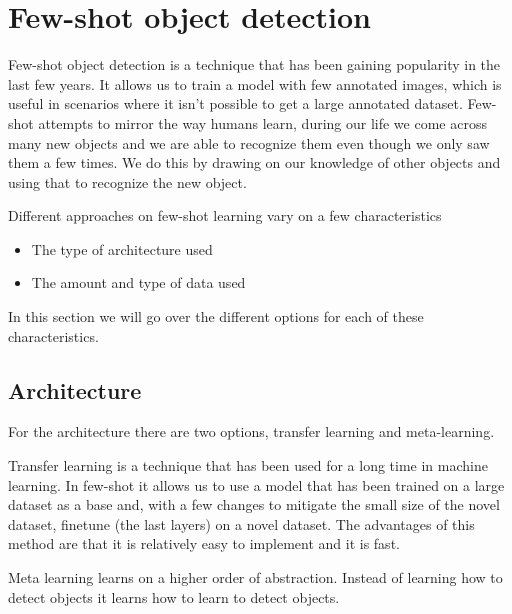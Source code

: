 

\section{Few-shot object detection}
Few-shot object detection is a technique that has been gaining popularity in the last few years. It allows us to train a model with few annotated images, which is useful in scenarios where it isn't possible to get a large annotated dataset. Few-shot attempts to mirror the way humans learn, during our life we come across many new objects and we are able to recognize them even though we only saw them a few times. We do this by drawing on our knowledge of other objects and using that to recognize the new object\cite{biederman1987recognition}. 

Different approaches on few-shot learning vary on a few characteristics
\begin{itemize}
	\item The type of architecture used
	\item The amount and type of data used
\end{itemize}

In this section we will go over the different options for each of these characteristics.

\subsection{Architecture}

For the architecture there are two options, transfer learning and meta-learning. 

Transfer learning is a technique that has been used for a long time in machine learning. In few-shot it allows us to use a model that has been trained on a large dataset as a base and, with a few changes to mitigate the small size of the novel dataset, finetune (the last layers) on a novel dataset. The advantages of this method are that it is relatively easy to implement and it is fast.

Meta learning learns on a higher order of abstraction. Instead of learning how to detect objects it learns how to learn to detect objects. 

